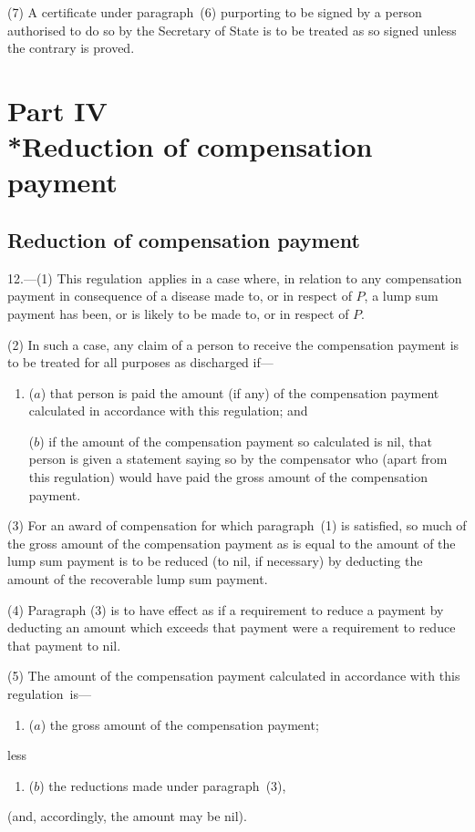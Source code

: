 \documentclass[12pt,a4paper]{article}
\begin{document}
(7) A certificate under paragraph~(6) purporting to be signed by a person authorised to do so by the Secretary of State is to be treated as so signed unless the contrary is proved.

\section[Part IV --- Reduction of compensation payment]{Part IV\\*Reduction of compensation payment}

\renewcommand\parthead{--- Part IV}

\subsection[12. Reduction of compensation payment]{Reduction of compensation payment}

12.---(1)  This regulation~applies in a case where, in relation to any compensation payment in consequence of a disease made to, or in respect of $P$, a lump sum payment has been, or is likely to be made to, or in respect of $P$.

(2) In such a case, any claim of a person to receive the compensation payment is to be treated for all purposes as discharged if—
\begin{enumerate}\item[]
($a$) that person is paid the amount (if any) of the compensation payment calculated in accordance with this regulation; and

($b$) if the amount of the compensation payment so calculated is nil, that person is given a statement saying so by the compensator who (apart from this regulation) would have paid the gross amount of the compensation payment.
\end{enumerate}

(3) For an award of compensation for which paragraph~(1) is satisfied, so much of the gross amount of the compensation payment as is equal to the amount of the lump sum payment is to be reduced (to nil, if necessary) by deducting the amount of the recoverable lump sum payment.

(4) Paragraph (3) is to have effect as if a requirement to reduce a payment by deducting an amount which exceeds that payment were a requirement to reduce that payment to nil.

(5) The amount of the compensation payment calculated in accordance with this regulation~is—
\begin{enumerate}\item[]
($a$) the gross amount of the compensation payment;
\end{enumerate}
less
\begin{enumerate}\item[]
($b$) the reductions made under paragraph~(3),
\end{enumerate}
(and, accordingly, the amount may be nil).
\end{document}
